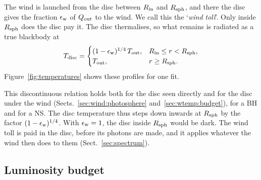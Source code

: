 

The wind is launched from the disc between $R_{\rm in}$ and $R_{\rm sph}$, and there the disc gives the fraction $\epsilon_{\rm w}$ of $Q_{\rm out}$  to the wind.
We call this the `\textit{wind toll}'.
Only inside $R_{\rm sph}$ does the disc pay it.
The disc thermalises, so what remains is radiated as a true blackbody at
\begin{equation}
T_{\rm disc} =
\begin{cases}
(1 - \epsilon_{\rm w})^{1/4}\,T_{\rm out}, & R_{\rm in} \le r < R_{\rm sph}, \\
T_{\rm out}, & r \ge R_{\rm sph} .
\end{cases}
\label{eq:Tdisc}
\end{equation}
Figure~\ref{fig:temperatures}  shows these profiles for one fit.

This discontinuous relation holds both for the disc seen directly and for the disc under the wind (Sects.~\ref{sec:wind:photosphere} and~\ref{sec:wtemp:budget}), for a BH and for a NS.
 The disc temperature thus steps down inwards at $R_{\rm sph}$ by the factor $(1 - \epsilon_{\rm w})^{1/4}$. With $\epsilon_{\rm w} = 1$, the disc inside $R_{\rm sph}$ would be dark. 
The wind toll is paid in the disc, before its photons are made, and it applies whatever the wind then does to them (Sect.~\ref{sec:spectrum}).

\subsection{Luminosity budget}
\label{sec:disc:budget}

